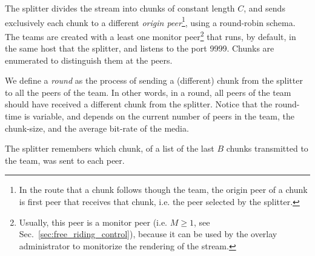 
\label{sec:feeding_the_team}

The splitter divides the stream into chunks of constant length $C$,
and sends exclusively each chunk to a different \emph{origin
  peer}\footnote{In the route that a chunk follows though the team,
  the origin peer of a chunk is first peer that receives that chunk,
  i.e. the peer selected by the splitter.}, using a round-robin
schema. The teams are created with a least one monitor
peer\footnote{Usually, this peer is a monitor peer (i.e. $M\geq 1$,
  see Sec.~\ref{sec:free_riding_control}), because it can be used by
  the overlay administrator to monitorize the rendering of the
  stream.} that runs, by default, in the same host that the splitter,
and listens to the port 9999. Chunks are enumerated to distinguish
them at the peers.

\begin{comment}
More details about the implementation
are available in Fig.~\ref{fig:chunk_generation}.


\begin{figure*}
  \fig{500}{5cm}{DBS_splitter_feed} \caption{Chunk
    generation at the splitter and their transmission to the
    team.\label{fig:chunk_generation}}
\end{figure*}
\end{comment}

We define a \emph{round} as the process of sending a (different) chunk
from the splitter to all the peers of the team. In other words, in a
round, all peers of the team should have received a different chunk
from the splitter. Notice that the round-time is variable, and depends
on the current number of peers in the team, the chunk-size, and the
average bit-rate of the media.

The splitter remembers which chunk, of a list of the last $B$ chunks
transmitted to the team, was sent to each peer.


